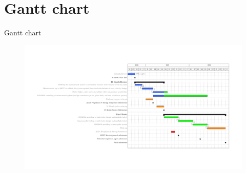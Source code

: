 \documentclass[aspectratio=169, 9pt]{beamer}
\begin{document}
\section{Gantt chart}
\begin{frame}{Gantt chart}
  \begin{figure}
    \centering
    \includegraphics[width=\textwidth]{images/gantt.pdf}
  \end{figure}
\end{frame}


{\wavesbg%
\begin{frame}%
\end{frame}}
\end{document}
